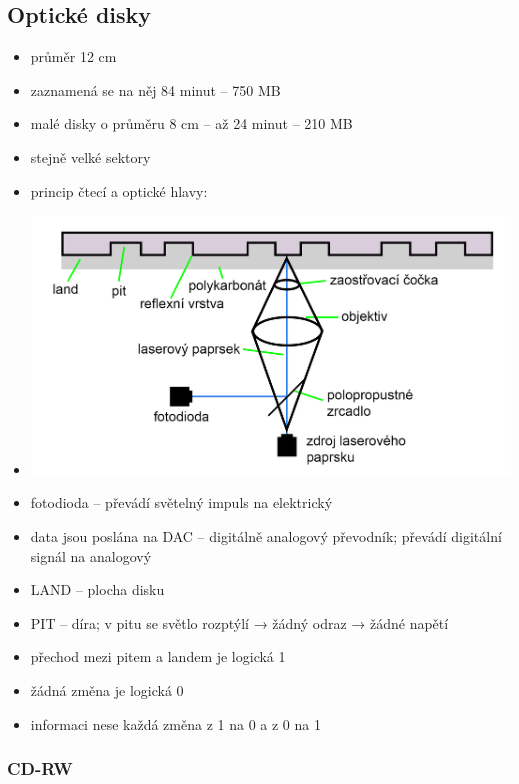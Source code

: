 \documentclass[a4paper,12pt]{article}
\providecommand{\tightlist}{%
\setlength{\itemsep}{0pt}\setlength{\parskip}{0pt}}
\begin{document}
\subsection{Optické disky}

\begin{itemize}
\tightlist
\item průměr 12 cm
\item zaznamená se na něj 84 minut -- 750 MB
\item malé disky o průměru 8 cm -- až 24 minut -- 210 MB
\item stejně velké sektory
\item princip čtecí a optické hlavy:
\item[] \includegraphics[width=12.896cm]{ref/princip-cteci-a-opticke-hlavy.png}
\item fotodioda -- převádí světelný impuls na elektrický
\item data jsou poslána na DAC -- digitálně analogový převodník; převádí
  digitální signál na analogový
\item LAND -- plocha disku
\item PIT -- díra; v pitu se světlo rozptýlí → žádný odraz → žádné napětí
\item přechod mezi pitem a landem je logická 1
\item žádná změna je logická 0
\item informaci nese každá změna z 1 na 0 a z 0 na 1
\end{itemize}

\subsubsection{CD-RW}
\end{document}
